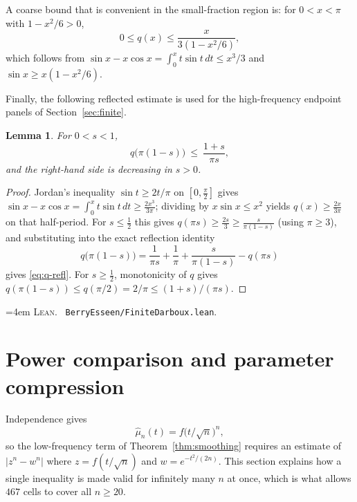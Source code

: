 \documentclass[10pt,a4paper]{article}
\theoremstyle{plain}
\newtheorem{lemma}[theorem]{Lemma}
\theoremstyle{definition}
\newcommand{\file}[1]{\texttt{#1}}
\newenvironment{leanref}%
  {\par\addvspace{3pt}\begingroup\sloppy\emergencystretch=4em
   \noindent\footnotesize\textsc{Lean.}\ \ignorespaces}%
  {\par\endgroup\addvspace{3pt}}
\begin{document}
A coarse bound that is convenient in the small-fraction region is: for
$0<x<\pi$ with $1-x^2/6>0$,
\begin{equation}\label{eq:q-coarse}
  0\le q(x)\le\frac{x}{3(1-x^2/6)},
\end{equation}
which follows from $\sin x-x\cos x=\int_0^xt\sin t\,dt\le x^3/3$ and
$\sin x\ge x(1-x^2/6)$.

Finally, the following reflected estimate is used for the high-frequency
endpoint panels of Section~\ref{sec:finite}.

\begin{lemma}\label{lem:q-reflected}
For $0<s<1$,
\begin{equation}\label{eq:q-refl}
  q\bigl(\pi(1-s)\bigr) \ \le\ \frac{1+s}{\pi s},
\end{equation}
and the right-hand side is decreasing in $s>0$.
\end{lemma}

\begin{proof}
Jordan's inequality $\sin t\ge2t/\pi$ on $[0,\tfrac\pi2]$ gives
$\sin x-x\cos x=\int_0^xt\sin t\,dt\ge\tfrac{2x^3}{3\pi}$; dividing by
$x\sin x\le x^2$ yields $q(x)\ge\tfrac{2x}{3\pi}$ on that half-period. For
$s\le\tfrac12$ this gives
$q(\pi s)\ge\tfrac{2s}{3}\ge\tfrac{s}{\pi(1-s)}$ (using $\pi\ge3$), and
substituting into the exact reflection identity
\[
  q\bigl(\pi(1-s)\bigr) = \frac1{\pi s}+\frac1\pi+\frac{s}{\pi(1-s)}-q(\pi s)
\]
gives \eqref{eq:q-refl}. For $s\ge\tfrac12$, monotonicity of $q$ gives
$q(\pi(1-s))\le q(\pi/2)=2/\pi\le(1+s)/(\pi s)$.
\end{proof}

\begin{leanref}
\file{BerryEsseen/FiniteDarboux.lean}.
\end{leanref}

\section{Power comparison and parameter compression}
\label{sec:compression}

Independence gives
\[
  \hat\mu_n(t) = f\bigl(t/\sqrt n\bigr)^n ,
\]
so the low-frequency term of Theorem~\ref{thm:smoothing} requires an estimate
of $|z^n-w^n|$ where $z=f(t/\sqrt n)$ and $w=e^{-t^2/(2n)}$. This section
explains how a single inequality is made valid for infinitely many $n$ at once,
which is what allows $467$ cells to cover all $n\ge20$.
\end{document}
